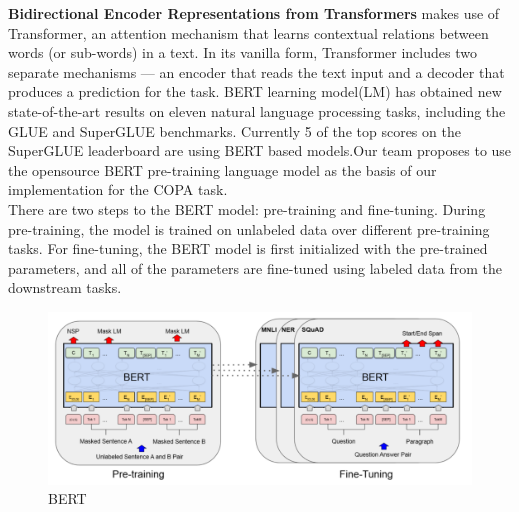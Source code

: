 \documentclass{article}
\begin{document}
\textbf{Bidirectional Encoder Representations from Transformers}
makes use of Transformer, an attention mechanism that learns contextual relations between words (or sub-words) in a text. In its vanilla form, Transformer includes two separate mechanisms — an encoder that reads the text input and a decoder that produces a prediction for the task. BERT learning model(LM) has obtained new state-of-the-art results on eleven natural language processing tasks, including the GLUE and SuperGLUE benchmarks.  Currently 5 of the top scores on the SuperGLUE leaderboard are using BERT based models.Our team proposes to use the opensource BERT pre-training language model as the basis of our implementation for the COPA task.
\\
There are two steps to the BERT model: pre-training and ﬁne-tuning. During pre-training, the model is trained on unlabeled data over different pre-training tasks. For ﬁne-tuning, the BERT model is ﬁrst initialized with the pre-trained parameters, and all of the parameters are ﬁne-tuned using labeled data from the downstream tasks.
\begin{figure}[ht]
\vskip 0.2in
\begin{center}
\centerline{\includegraphics[width=\columnwidth]{BERT.png}}
\caption{BERT}
\label{icml-historical}
\end{center}
\vskip -0.2in
\end{figure}
\end{document}
